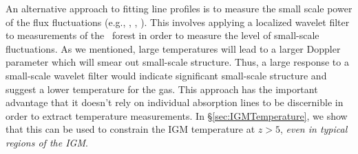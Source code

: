 An alternative approach to fitting line profiles is to measure the small scale power of the flux fluctuations (e.g., \citealt{Lidz2010}, \citealt{Theuns2002a}, \citealt{zaldarriaga2002searching}). This involves applying a localized wavelet filter to measurements of the \lya\ forest in order to measure the level of small-scale fluctuations. As we mentioned, large temperatures will lead to a larger Doppler parameter which will smear out small-scale structure. Thus, a large response to a small-scale wavelet filter would indicate significant small-scale structure and suggest a lower temperature for the gas. This approach has the important advantage that it doesn't rely on individual absorption lines to be discernible in order to extract temperature measurements. In \S \ref{sec:IGMTemperature}, we show that this can be used to constrain the IGM temperature at $z > 5$, \textit{even in typical regions of the IGM}.


